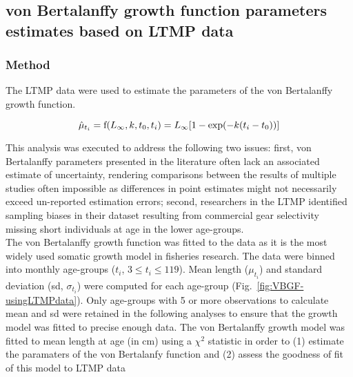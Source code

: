 
\subsection{von Bertalanffy growth function parameters estimates based on LTMP data}

\subsubsection{Method}

The LTMP data were used to estimate the parameters of the von Bertalanffy \citep{vb57} growth function. 

\begin{equation}
\hat{\mu}_{t_{i}} = {\rm f}(L_{\infty}, k, t_{0},t_{i}) = L_{\infty} [ 1 - {\rm exp} ( - k ( t_{i} - t_{0})) ]
\end{equation}

This analysis was executed to address the following two issues: first, von Bertalanffy parameters presented in the literature often lack an associated estimate of uncertainty, rendering comparisons between the results of multiple studies often impossible as differences in point estimates might not necessarily exceed un-reported estimation errors; second, researchers in the LTMP identified sampling biases in their dataset resulting from commercial gear selectivity missing short individuals at age in the lower age-groups.\\

The von Bertalanffy \citep{vb57} growth function was fitted to the data as it is the most widely used somatic growth model in fisheries research. The data were binned into monthly age-groups ($t_{i}$, $ 3 \leq t_{i} \leq 119$). Mean length ($\mu_{t_{i}}$) and standard deviation (sd, $\sigma_{t_{i}}$) were computed for each age-group (Fig.~\ref{fig:VBGF-usingLTMPdata}). Only age-groups with 5 or more observations to calculate mean and sd were retained in the following analyses to ensure that the growth model was fitted to precise enough data. The von Bertalanffy growth model was fitted to mean length at age (in cm) using a $\chi^{2}$ statistic in order to (1) estimate the paramaters of the von Bertalanfy function and (2) assess the goodness of fit of this model to LTMP data \citep{cow98b}

